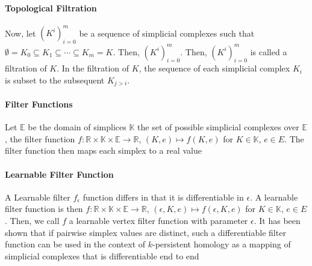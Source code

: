 




\paragraph{Topological Filtration}
\label{ssSec:filtration_functions}
Now, let $(K^i)^m_{i=0}$ be a sequence of simplicial complexes such that 
$\emptyset = K_0 \subseteq K_1 \subseteq \cdots \subseteq K_m = K. \text{ Then, } (K^i)_{i=0}^m$. Then, $(K^i)_{i=0}^m$ is called a filtration of $K$. In the filtration of $K$, the sequence of each simplicial complex $K_i$ is subset to the subsequent $K_{j>i}$.

\paragraph{Filter Functions}
\label{par:filter_functions}

Let \( \mathbb{E} \) be the domain of simplices \( \mathbb{K} \) the set of possible simplicial complexes over \( \mathbb{E} \), the filter function \( f : \mathbb{R} \times \mathbb{K} \times \mathbb{E} \to \mathbb{R} \), \(( K, e) \mapsto f( K, e)\) for \( K \in \mathbb{K} \), \( e \in E \). The filter function then maps each simplex to a real value
%
%
\paragraph{Learnable Filter Function}
\label{par:learnable_filter_function}
A Learnable filter \(f_{\epsilon}\) function differs in that it is differentiable in $\epsilon$. A learnable filter function is then \( f : \mathbb{R} \times \mathbb{K} \times \mathbb{E} \to \mathbb{R} \), \((\epsilon, K, e) \mapsto f( \epsilon, K, e)\) for \( K \in \mathbb{K} \), \( e \in E \). Then, we call \( f \) a learnable vertex filter function with parameter \( \epsilon \). It has been shown that if pairwise simplex values are distinct, such a differentiable filter function can be used in the context of $k$-persistent homology as a mapping of simplicial complexes that is differentiable end to end~\cite{hofer2020graph}

